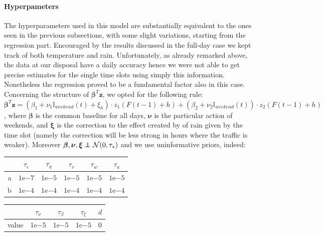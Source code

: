\documentclass[11pt,twoside]{report}
\newcommand\independent{\protect\mathpalette{\protect\independenT}{\perp}}
\def\independenT#1#2{\mathrel{\rlap{$#1#2$}\mkern2mu{#1#2}}}
\begin{document}
\paragraph{Hyperpameters}
The hyperparameters used in this model are substantially equivalent to the ones seen in the previous subsections, with some slight variations, starting from the regression part. Encouraged by the results discussed in the full-day case we kept track of both temperature and rain. Unfortunately, as already remarked above, the data at our disposal have a daily accuracy hence we were not able to get precise estimates for the single time slots using simply this information. Nonetheless the regression proved to be a fundamental factor also in this case. Concerning the structure of $ \boldsymbol{\beta}^T\mathbf{z} $, we opted for the following rule: $ \boldsymbol{\beta}^T\mathbf{z} = (\beta_1+\nu_1\mathbb{I}_{weekend}(t)+\xi_h)\cdot z_1(F(t-1)+h) + (\beta_2+\nu_2\mathbb{I}_{weekend}(t))\cdot z_2(F(t-1)+h)$, where $ \boldsymbol{\beta} $ is the common baseline for all days, $ \boldsymbol{\nu} $ is the particular action of weekends, and $ \boldsymbol{\xi} $ is the correction to the effect created by of rain given by the time slot (namely the correction will be less strong in hours where the traffic is weaker). Moreover $ \boldsymbol{\beta},\boldsymbol{\nu},\boldsymbol{\xi}\independent\mathcal{N}(0,\tau_*) $ and we use uninformative priors, indeed:

\begin{table}[!htb]
	\begin{subtable}{.5\linewidth}
		\centering
		\begin{tabular}{|c|c|c|c|c|c|}
			\hline
			& $ \tau_\epsilon $ & $ \tau_\eta $ &$  \tau_v $ & $ \tau_w $ & $ \tau_ u $\\
			\hline
			a &$  1\mathrm{e}{-7} $ & $  1\mathrm{e}{-5} $ &$  1\mathrm{e}{-5} $&$  1\mathrm{e}{-5} $&$  1\mathrm{e}{-5} $\\
			\hline
			b &$  1\mathrm{e}{-4} $ & $  1\mathrm{e}{-4} $ &$  1\mathrm{e}{-4} $&$  1\mathrm{e}{-4} $&$  1\mathrm{e}{-4} $\\
			\hline
		\end{tabular} 
	\end{subtable}%
	\begin{subtable}{.5\linewidth}
		\centering
		\begin{tabular}{|c|c|c|c|c|}
			\hline
			& $ \tau_\nu $ & $ \tau_\beta $ & $ \tau_\xi $ & $ d $\\
			\hline
			value &$  1\mathrm{e}{-5} $ & $  1\mathrm{e}{-5} $& $ 1\mathrm{e}{-5} $ & 0\\
			\hline
		\end{tabular} 
	\end{subtable} 
\end{table}
\end{document}
